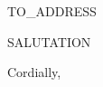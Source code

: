 \documentclass[]{letter}
\begin{document}

\begin{letter}{TO\_ADDRESS}
\address{ADDRESS}
\opening{SALUTATION}




\signature{Jacob Archambault}

\closing{Cordially,\\
	 \\
}


\end{letter}
\end{document}

